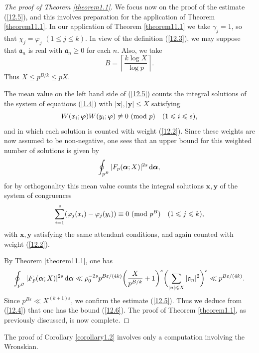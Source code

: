 \documentclass[12pt,reqno]{amsart}
\theoremstyle{definition}
\theoremstyle{remark}
\numberwithin{equation}{section}
\newcommand{\mmod}[1]{\,\,(\text{\rm mod}\,\,#1)}
\def\bfx{{\mathbf x}}
\def\bfy{{\mathbf y}}
\def\gra{{\mathfrak a}}\def\grA{{\mathfrak A}}\def\bfgra{{\boldsymbol \gra}}
\def\gam{{\gamma}} \def\Gam{{\Gamma}}
\def\eps{\varepsilon}
\def\le{\leqslant} \def\ge{\geqslant} \def\pleq{\preccurlyeq} \def\ple{\prec}
\def\d{{\,{\rm d}}}
\begin{document}
\begin{proof}[The proof of Theorem \ref{theorem1.1}]
We focus now on the proof of the estimate (\ref{12.5}), and this involves preparation for 
the application of Theorem \ref{theorem11.1}. In our application of Theorem 
\ref{theorem11.1} we take $\gam_j=1$, so that $\chi_j=\varphi_j$ $(1\le j\le k)$. In view 
of the definition (\ref{12.3}), we may suppose that $\gra_n$ is real with $\gra_n\ge 0$ for 
each $n$. Also, we take
$$B=\left\lceil \frac{k\log X}{\log p}\right\rceil .$$
Thus $X\le p^{B/k}\le pX$.\par

The mean value on the left hand side of (\ref{12.5}) counts the integral solutions of the 
system of equations (\ref{1.4}) with $|\bfx|,|\bfy|\le X$ satisfying
$$W(x_i;\bfvarphi)W(y_i;\bfvarphi)\not \equiv 0\mmod{p}\quad (1\le i\le s),$$
and in which each solution is counted with weight (\ref{12.2}). Since these weights are now 
assumed to be non-negative, one sees that an upper bound for this weighted number of 
solutions is given by
$$\oint_{p^B}|F_p(\bfalp;X)|^{2s}\d\bfalp ,$$
for by orthogonality this mean value counts the integral solutions $\bfx,\bfy$ of the system 
of congruences
$$\sum_{i=1}^s(\varphi_j(x_i)-\varphi_j(y_i))\equiv 0\mmod{p^B}\quad (1\le j\le k),$$
with $\bfx,\bfy$ satisfying the same attendant conditions, and again counted with weight 
(\ref{12.2}).\par

By Theorem \ref{theorem11.1}, one has
$$\oint_{p^B} |F_p(\bfalp;X)|^{2s}\d\bfalp \ll \rho_0^{-2s}p^{B\eps/(4k)}\biggl( 
\frac{X}{p^{B/k}}+1\biggr)^s\biggl( \sum_{|n|\le X}|\gra_n|^2\biggr)^s\ll 
p^{B\eps/(4k)}.$$
Since $p^{B\eps}\ll X^{(k+1)\eps}$, we confirm the estimate (\ref{12.5}). Thus we deduce 
from (\ref{12.4}) that one has the bound (\ref{12.6}). The proof of Theorem 
\ref{theorem1.1}, as previously discussed, is now complete.
\end{proof}

The proof of Corollary \ref{corollary1.2} involves only a computation involving the 
Wronskian.
\end{document}
